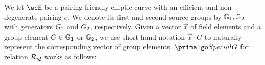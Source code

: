 \noindent We let $\ecE$ be a pairing-friendly elliptic curve with an efficient and 
non-degenerate pairing $e$. We denote its first  and second source groups by $ \mathbb{G}_1,\mathbb{G}_2 $ with generators 
${G}_1$ and ${G}_2$, respectively.
Given a vector $ \vec{x} $ of field elements  and a group element $ G \in \mathbb{G}_1 $ or $ \mathbb{G}_2 $, we use short hand notation $ \vec{x} \cdot G $ to naturally represent the corresponding vector of group elements.
$ \SpecialG $ for relation $\mathcal{R}_{\mathcal{Q}}$ works as follows: %
